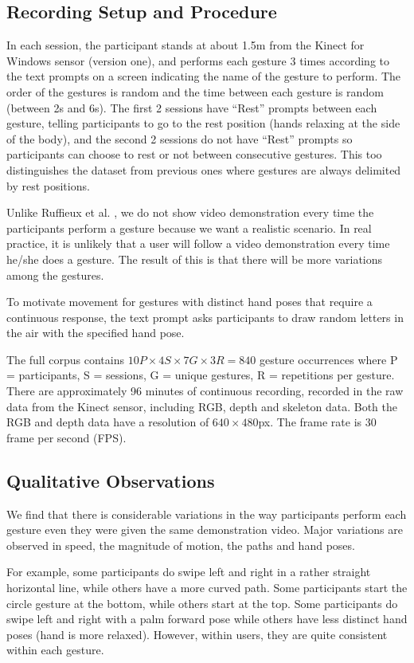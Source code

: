 \subsection{Recording Setup and Procedure}
In each session, the participant stands at about 1.5m from the Kinect
for Windows sensor (version one), and performs each gesture 3 times
according to the text prompts on a screen indicating the name of the gesture to
perform.
The order of the gestures is random and the time between each gesture is random
(between 2s and 6s). The first 2 sessions have ``Rest'' prompts between each
gesture, telling participants to go to the rest position (hands relaxing at the
side of the body), and the second 2 sessions do not have ``Rest'' prompts so
participants can choose to rest or not between consecutive gestures. This too
distinguishes the dataset from previous ones \cite{Ruffieux2013, guyon13} where
gestures are always delimited by rest positions.

Unlike Ruffieux et al. \cite{Ruffieux2013}, we do not show video demonstration
every time the participants perform a gesture because we want a
realistic scenario. In real practice, it is unlikely that a user will follow a
video demonstration every time he/she does a gesture. The result of this is that
there will be more variations among the gestures.

To motivate movement for gestures with distinct hand poses that
require a continuous response, the text prompt asks participants to draw
random letters in the air with the specified hand pose. 

The full corpus contains $
10P \times 4S \times 7G \times 3R = 840$ gesture occurrences
where P = participants, S = sessions, G = unique gestures, R = repetitions per
gesture. There are approximately 96 minutes of continuous recording,
recorded in the raw data from the Kinect sensor, including RGB, depth and
skeleton data. Both the RGB and depth data have a resolution of
$640\times480$px. The frame rate is 30 frame per second (FPS).

\subsection{Qualitative Observations}
We find that there is considerable variations in the way participants perform
each gesture even they were given the same demonstration video. Major variations
are observed in speed, the magnitude of motion, the paths and hand poses.

For example, some participants do swipe left and right in a rather straight
horizontal line, while others have a more curved path. Some participants start
the circle gesture at the bottom, while others start at the top. Some
participants do swipe left and right with a palm forward pose while others have
less distinct hand poses (hand is more relaxed). However, within users, they are
quite consistent within each gesture. 

